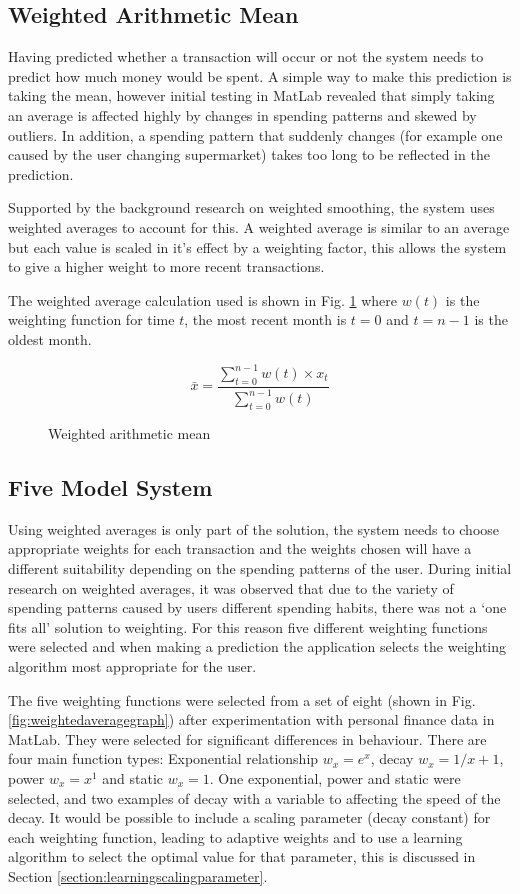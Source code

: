 \subsection{Weighted Arithmetic Mean}
Having predicted whether a transaction will occur or not the system needs to predict how much money would be spent. A simple way to make this prediction is taking the mean, however initial testing in MatLab revealed that simply taking an average is affected highly by changes in spending patterns and skewed by outliers. In addition, a spending pattern that suddenly changes (for example one caused by the user changing supermarket) takes too long to be reflected in the prediction.

Supported by the background research on weighted smoothing, the system uses weighted averages to account for this. A weighted average is similar to an average but each value is scaled in it's effect by a weighting factor, this allows the system to give a higher weight to more recent transactions.

The weighted average calculation used is shown in Fig. \ref{fig:weighting} where $w(t)$ is the weighting function for time $t$, the most recent month is $t = 0$ and $t = n - 1$ is the oldest month. 

\begin{figure}[h]
    \centering
    \[
        \bar{x} = 
        \frac{
                \sum\limits^{n-1}_{t=0}{w(t) \times x_t}
            }{
                \sum\limits_{t=0}^{n-1}{w(t)}
        } 
    \]
    \caption{Weighted arithmetic mean}
    \label{fig:weighting}
\end{figure}

\subsection{Five Model System} \label{sub:fivemodelsystem}
Using weighted averages is only part of the solution, the system needs to choose appropriate weights for each transaction and the weights chosen will have a different suitability depending on the spending patterns of the user.
% 
During initial research on weighted averages, it was observed that due to the variety of spending patterns caused by users different spending habits, there was not a `one fits all' solution to weighting.
%
For this reason five different weighting functions were selected and when making a prediction the application selects the weighting algorithm most appropriate for the user.

The five weighting functions were selected from a set of eight (shown in Fig. \ref{fig:weightedaveragegraph}) after experimentation with personal finance data in MatLab. They were selected for significant differences in behaviour.
%
There are four main function types: Exponential relationship $w_x = e^{x}$, decay $w_x = {1}/{x + 1}$, power $w_x = x^1 $ and static $w_x = 1$. One exponential, power and static were selected, and two examples of decay with a variable to affecting the speed of the decay. It would be possible to include a scaling parameter (decay constant) for each weighting function, leading to adaptive weights and to use a learning algorithm to select the optimal value for that parameter, this is discussed in Section \ref{section:learningscalingparameter}.

